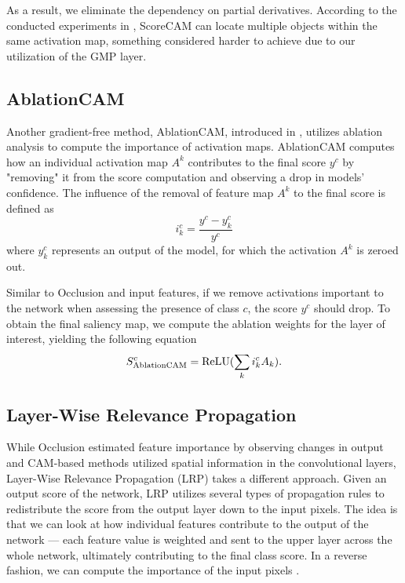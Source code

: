 As a result, we eliminate the dependency on partial derivatives.
According to the conducted experiments in \cite{score-cam}, ScoreCAM can locate multiple objects within the same activation map, something considered harder to achieve due to our utilization of the GMP layer.

\subsection{AblationCAM}

Another gradient-free method, AblationCAM, introduced in \cite{ablation-cam}, utilizes ablation analysis to compute the importance of activation maps.
AblationCAM computes how an individual activation map $A^k$ contributes to the final score $y^c$ by "removing" it from the score computation and observing a drop in models' confidence.
The influence of the removal of feature map $A^k$ to the final score is defined as
\begin{equation}\label{eq:ablation-cam-importance-weight}
    i^c_k = \frac{y^c - y^c_k}{y^c}
\end{equation}
where $y^c_k$ represents an output of the model, for which the activation $A^k$ is zeroed out.

Similar to Occlusion and input features, if we remove activations important to the network when assessing the presence of class $c$, the score $y^c$ should drop. To obtain the final saliency map, we compute the ablation weights for the layer of interest, yielding the following equation
\begin{equation}
    S^c_{\text{AblationCAM}} = \operatorname{ReLU}(\sum_k i^c_k A_k).
\end{equation}

\subsection{Layer-Wise Relevance Propagation}

While Occlusion estimated feature importance by observing changes in output and CAM-based methods utilized spatial information in the convolutional layers, Layer-Wise Relevance Propagation (LRP) \cite{lrp} takes a different approach.
Given an output score of the network, LRP utilizes several types of propagation rules to redistribute the score from the output layer down to the input pixels.
The idea is that we can look at how individual features contribute to the output of the network --- each feature value is weighted and sent to the upper layer across the whole network, ultimately contributing to the final class score.
In a reverse fashion, we can compute the importance of the input pixels \cite{lrp}.

